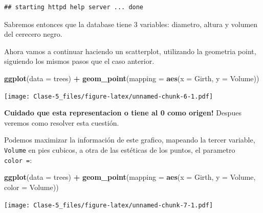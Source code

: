 \documentclass[
]{article}
\newenvironment{Shaded}{\begin{snugshade}}{\end{snugshade}}
\newcommand{\DataTypeTok}[1]{\textcolor[rgb]{0.13,0.29,0.53}{#1}}
\newcommand{\KeywordTok}[1]{\textcolor[rgb]{0.13,0.29,0.53}{\textbf{#1}}}
\newcommand{\NormalTok}[1]{#1}
\newcommand{\OperatorTok}[1]{\textcolor[rgb]{0.81,0.36,0.00}{\textbf{#1}}}
\newcommand{\StringTok}[1]{\textcolor[rgb]{0.31,0.60,0.02}{#1}}
\begin{document}
\begin{verbatim}
## starting httpd help server ... done
\end{verbatim}

Sabremos entonces que la database tiene 3 variables: diametro, altura y
volumen del cerecero negro.

Ahora vamos a continuar haciendo un scatterplot, utilizando la geometria
point, siguiendo los mismos pasos que el caso anterior.

\begin{Shaded}
\begin{Highlighting}[]
\KeywordTok{ggplot}\NormalTok{(}\DataTypeTok{data =}\NormalTok{ trees) }\OperatorTok{+}\StringTok{ }
\StringTok{  }\KeywordTok{geom\_point}\NormalTok{(}\DataTypeTok{mapping =} \KeywordTok{aes}\NormalTok{(}\DataTypeTok{x =}\NormalTok{ Girth, }\DataTypeTok{y =}\NormalTok{ Volume))}
\end{Highlighting}
\end{Shaded}

\texttt{[image: Clase-5\_files/figure-latex/unnamed-chunk-6-1.pdf]}

\textbf{Cuidado que esta representacion o tiene al 0 como origen!}
Despues veremos como resolver esta cuestión.

Podemos maximizar la información de este grafico, mapeando la tercer
variable, \texttt{Volume} en pies cubicos, a otra de las estéticas de
los puntos, el parametro \texttt{color\ =}:

\begin{Shaded}
\begin{Highlighting}[]
\KeywordTok{ggplot}\NormalTok{(}\DataTypeTok{data =}\NormalTok{ trees) }\OperatorTok{+}\StringTok{ }
\StringTok{  }\KeywordTok{geom\_point}\NormalTok{(}\DataTypeTok{mapping =} \KeywordTok{aes}\NormalTok{(}\DataTypeTok{x =}\NormalTok{ Girth, }\DataTypeTok{y =}\NormalTok{ Volume, }\DataTypeTok{color =}\NormalTok{ Volume))}
\end{Highlighting}
\end{Shaded}

\texttt{[image: Clase-5\_files/figure-latex/unnamed-chunk-7-1.pdf]}
\end{document}
